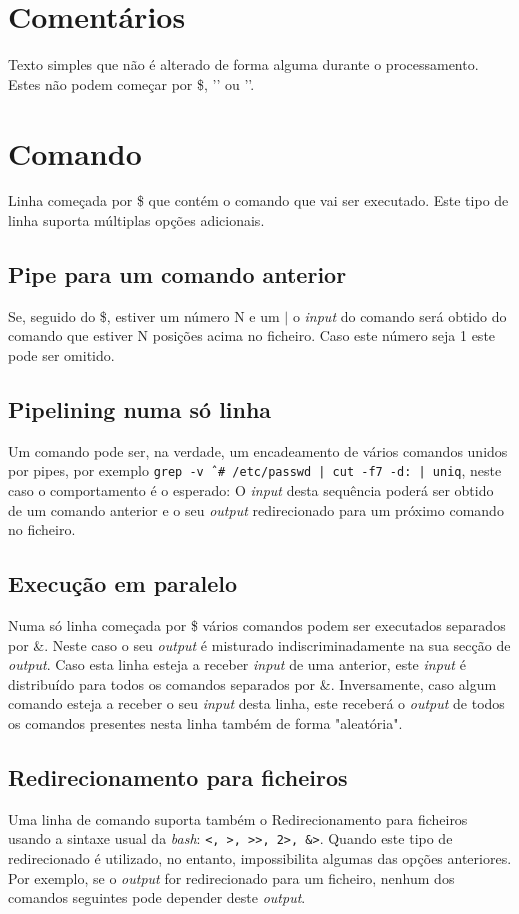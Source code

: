 \documentclass[12pt,a4paper]{report}
\begin{document}
    \section{Comentários}
        Texto simples que não é alterado de forma alguma durante o
        processamento. Estes não podem começar por \$, '\outputStart' ou
        '\outputEnd'.
    \section{Comando}
        Linha começada por \$ que contém o comando que vai ser executado.
        Este tipo de linha suporta múltiplas opções adicionais.
        \subsection{Pipe para um comando anterior}
            Se, seguido do \$, estiver um número N e um $|$ o \textit{input} do
            comando será obtido do comando que estiver N posições acima no
            ficheiro. Caso este número seja 1 este pode ser omitido.
        \subsection{Pipelining numa só linha}
            Um comando pode ser, na verdade, um encadeamento de vários comandos
            unidos por pipes, por exemplo
            \texttt{grep -v ˆ# /etc/passwd | cut -f7 -d: | uniq},
            neste caso o comportamento é o esperado: O \textit{input} desta
            sequência poderá ser obtido de um comando anterior e o seu
            \textit{output} redirecionado para um próximo comando no ficheiro.
        \subsection{Execução em paralelo}
            Numa só linha começada por \$ vários comandos podem ser executados
            separados por \&. Neste caso o seu \textit{output} é misturado
            indiscriminadamente na sua secção de \textit{output}. Caso esta
            linha esteja a receber \textit{input} de uma anterior, este
            \textit{input} é distribuído para todos os comandos separados por
            \&. Inversamente, caso algum comando esteja a receber o seu
            \textit{input} desta linha, este receberá o \textit{output} de todos
            os comandos presentes nesta linha também de forma "aleatória".
        \subsection{Redirecionamento para ficheiros}
            Uma linha de comando suporta também o Redirecionamento para
            ficheiros usando a sintaxe usual da \textit{bash}:
            \texttt{<, >, >>, 2>, &>}.
            Quando este tipo de redirecionado é utilizado, no entanto,
            impossibilita algumas das opções anteriores. Por exemplo,
            se o \textit{output} for redirecionado para um ficheiro, nenhum dos
            comandos seguintes pode depender deste \textit{output}.
\end{document}
